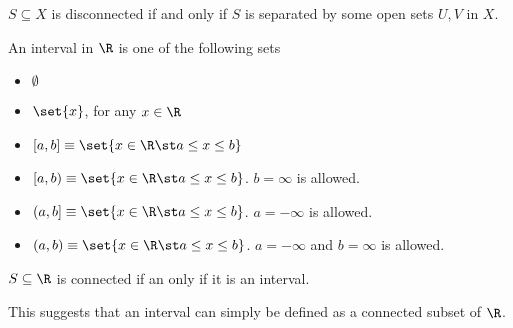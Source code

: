 \begin{nprop}
  $S \subseteq X$ is disconnected if and only if $S$ is separated by some open sets $U, V$ in $X$.
\end{nprop}

An interval in $\R$ is one of the following sets
\begin{itemize}
\item $\emptyset$
\item $\set{x}$, for any $x \in \R$
\item $[a,b] \equiv \set{x \in \R \st a \leq x \leq b}$
\item $[a,b) \equiv \set{x \in \R \st a \leq x \leq b}$. $b=\infty$ is allowed.
\item $(a,b] \equiv \set{x \in \R \st a \leq x \leq b}$. $a=-\infty$ is allowed.
\item $(a,b) \equiv \set{x \in \R \st a \leq x \leq b}$. $a=-\infty$ and $b=\infty$ is allowed.
\end{itemize}

\begin{nlemma}
  $S \subseteq \R$ is connected if an only if it is an interval.
\end{nlemma}
This suggests that an interval can simply be defined as a connected subset of $\R$.